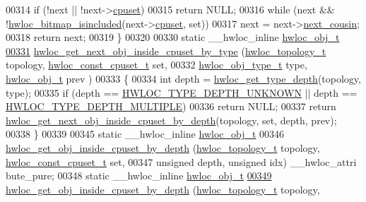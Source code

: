 \begin{DoxyCode}
{{00314   \textcolor{keywordflow}{if} (!next || !next->\hyperlink{a00016_a67925e0f2c47f50408fbdb9bddd0790f}{cpuset})
00315     \textcolor{keywordflow}{return} NULL;
00316   \textcolor{keywordflow}{while} (next && !\hyperlink{a00065_gaae29e14a926c198e8f91e6e4790621e7}{hwloc_bitmap_isincluded}(next->\hyperlink{a00016_a67925e0f2c47f50408fbdb9bddd0790f}{cpuset}, \textcolor{keyword}{set}))
00317     next = next->\hyperlink{a00016_a85a788017457129589318b6c39451acf}{next_cousin};
00318   \textcolor{keywordflow}{return} next;
00319 \}
00320 
00330 \textcolor{keyword}{static} \_\_hwloc\_inline \hyperlink{a00016}{hwloc_obj_t}
\hypertarget{a00031_source_l00331}{}\hyperlink{a00054_ga934e7ecd68b33403e0c0be779d9ed1e6}{00331} \hyperlink{a00054_ga934e7ecd68b33403e0c0be779d9ed1e6}{hwloc_get_next_obj_inside_cpuset_by_type} (\hyperlink{a00039_ga9d1e76ee15a7dee158b786c30b6a6e38}{hwloc_topology_t} topology, 
      \hyperlink{a00040_ga1f784433e9b606261f62d1134f6a3b25}{hwloc_const_cpuset_t} \textcolor{keyword}{set},
00332                                           \hyperlink{a00041_gacd37bb612667dc437d66bfb175a8dc55}{hwloc_obj_type_t} type, \hyperlink{a00016}{hwloc_obj_t} prev
      )
00333 \{
00334   \textcolor{keywordtype}{int} depth = \hyperlink{a00046_gaea7c64dd59467f5201ba87712710b14d}{hwloc_get_type_depth}(topology, type);
00335   \textcolor{keywordflow}{if} (depth == \hyperlink{a00046_ggaf4e663cf42bbe20756b849c6293ef575a0565ab92ab72cb0cec91e23003294aad}{HWLOC_TYPE_DEPTH_UNKNOWN} || depth == \hyperlink{a00046_ggaf4e663cf42bbe20756b849c6293ef575ae99465995cacde6c210d5fc2e409798c}{HWLOC_TYPE_DEPTH_MULTIPLE})
00336     \textcolor{keywordflow}{return} NULL;
00337   \textcolor{keywordflow}{return} \hyperlink{a00054_ga8af256c2572f16520f95440b884c1bd6}{hwloc_get_next_obj_inside_cpuset_by_depth}(topology, \textcolor{keyword}{set}, depth, prev);
00338 \}
00339 
00345 \textcolor{keyword}{static} \_\_hwloc\_inline \hyperlink{a00016}{hwloc_obj_t}
00346 \hyperlink{a00054_ga57c8a0e227d1b16a31d19aaf755b42c0}{hwloc_get_obj_inside_cpuset_by_depth} (\hyperlink{a00039_ga9d1e76ee15a7dee158b786c30b6a6e38}{hwloc_topology_t} topology, 
      \hyperlink{a00040_ga1f784433e9b606261f62d1134f6a3b25}{hwloc_const_cpuset_t} \textcolor{keyword}{set},
00347                                       \textcolor{keywordtype}{unsigned} depth, \textcolor{keywordtype}{unsigned} idx) \_\_hwloc\_attri
      bute\_pure;
00348 \textcolor{keyword}{static} \_\_hwloc\_inline \hyperlink{a00016}{hwloc_obj_t}
\hypertarget{a00031_source_l00349}{}\hyperlink{a00054_ga57c8a0e227d1b16a31d19aaf755b42c0}{00349} \hyperlink{a00054_ga57c8a0e227d1b16a31d19aaf755b42c0}{hwloc_get_obj_inside_cpuset_by_depth} (\hyperlink{a00039_ga9d1e76ee15a7dee158b786c30b6a6e38}{hwloc_topology_t} topology, 
}}
\end{DoxyCode}
